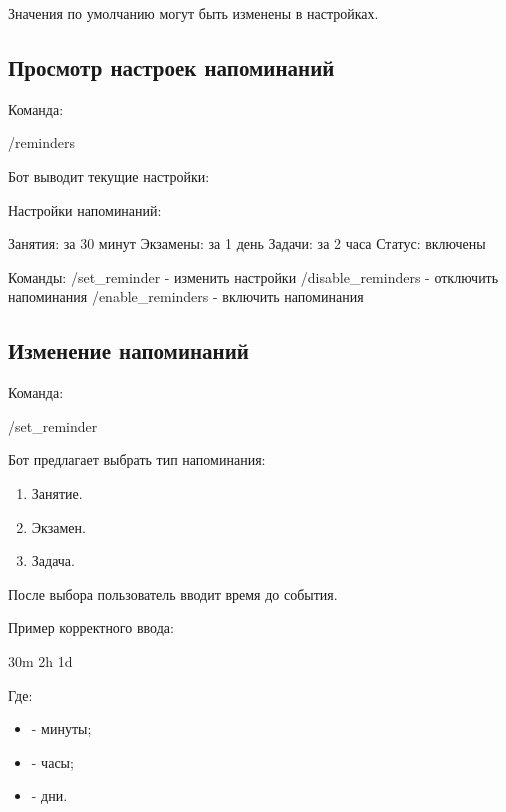 \documentclass[10pt,a4paper,final]{article} %
\begin{document}
Значения по умолчанию могут быть изменены в настройках.

\subsection{Просмотр настроек напоминаний}

Команда:

\begin{Code}
/reminders
\end{Code}

Бот выводит текущие настройки:

\begin{Code}
Настройки напоминаний:

Занятия: за 30 минут
Экзамены: за 1 день
Задачи: за 2 часа
Статус: включены

Команды:
/set_reminder - изменить настройки
/disable_reminders - отключить напоминания
/enable_reminders - включить напоминания
\end{Code}

\subsection{Изменение напоминаний}

Команда:

\begin{Code}
/set_reminder
\end{Code}

Бот предлагает выбрать тип напоминания:

\begin{enumerate}
    \item Занятие.
    \item Экзамен.
    \item Задача.
\end{enumerate}

После выбора пользователь вводит время до события.

Пример корректного ввода:

\begin{Code}
30m
2h
1d
\end{Code}

Где:

\begin{itemize}
    \item {} - минуты;
    \item {} - часы;
    \item {} - дни.
\end{itemize}
\end{document}
